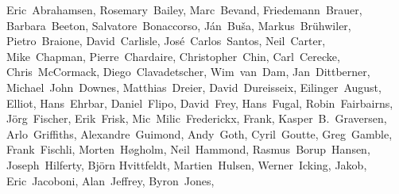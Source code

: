 { \flushleft\small
Eric~Abrahamsen,        %
Rosemary~Bailey,        %
Marc~Bevand,            %
Friedemann~Brauer,      %
Barbara~Beeton,         %
Salvatore~Bonaccorso,   %
Ján~Buša,               %
Markus~Br\"uhwiler,     %
Pietro~Braione,         %
David~Carlisle,         %
Jos\'e~Carlos~Santos,   %
Neil~Carter,            %
Mike~Chapman,           %
Pierre~Chardaire,       %
Christopher~Chin,       %
Carl~Cerecke,           %
Chris~McCormack,        %
Diego~Clavadetscher,    %
Wim~van~Dam,            %
Jan~Dittberner,         %
Michael~John~Downes,    %
Matthias~Dreier,        %
David~Dureisseix,       %
Eilinger~August,        %
Elliot,                 %
Hans~Ehrbar,            %
Daniel~Flipo,           %
David~Frey,             %
Hans~Fugal,             %
Robin~Fairbairns,       %
J\"org~Fischer,        %
Erik~Frisk,             %
Mic~Milic~Frederickx,   %
Frank,                  %
Kasper~B.~Graversen,    %
Arlo~Griffiths,         %
Alexandre~Guimond,      %
Andy~Goth,              %
Cyril~Goutte,           %
Greg~Gamble,            %
Frank~Fischli,          %
Morten~H\o gholm,		%
Neil~Hammond,           %
Rasmus~Borup~Hansen,    %
Joseph~Hilferty,        %
Bj\"orn Hvittfeldt,     %
Martien~Hulsen,         %
Werner~Icking,          %
Jakob,                  %
Eric~Jacoboni,          %
Alan~Jeffrey,           %
Byron~Jones,            %
}
